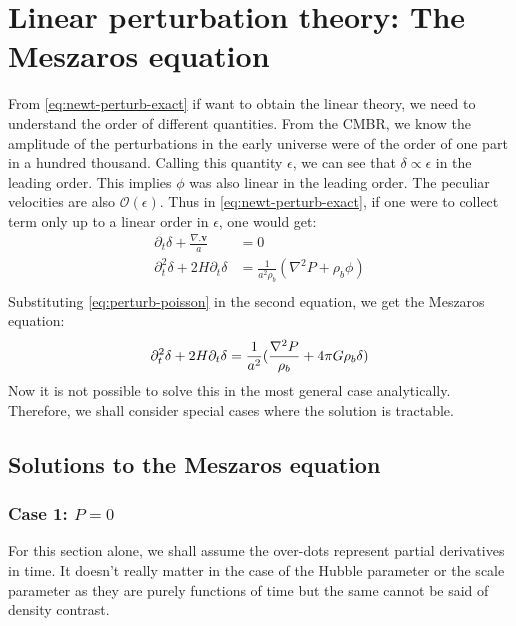 \documentclass[12pt,a4paper,oneside]{book}
\def\pa{{\partial}}
\begin{document}
	\section{Linear perturbation theory: The Meszaros equation}
		From \ref{eq:newt-perturb-exact} if want to obtain the linear theory, we need to understand the order of different quantities. From the CMBR, we know the amplitude of the perturbations in the early universe were of the order of one part in a hundred thousand. Calling this quantity $\epsilon$, we can see that $\delta\propto\epsilon$ in the leading order. This implies $\phi$ was also linear in the leading order. The peculiar velocities are also $\mathcal{O}(\epsilon)$. Thus in \ref{eq:newt-perturb-exact}, if one were to collect term only up to a linear order in $\epsilon$, one would get:
		$$
		\begin{aligned}
			\partial_t\delta+\frac{\nabla.\mathbf{v}}{a}&=0\\
			\pa_t^2\delta+2H\pa_t\delta&=\frac{1}{a^2\rho_b}(\nabla^2P+\rho_b\phi)\\
		\end{aligned}
		$$
		Substituting \ref{eq:perturb-poisson} in the second equation, we get the Meszaros equation:
		\begin{equation}
			\pa_t^2\delta+2H\pa_t\delta=\frac{1}{a^2}(\frac{\nabla^2P}{\rho_b}+4\pi G\rho_b\delta)\\
			\label{eq:meszaros}
		\end{equation}
		Now it is not possible to solve this in the most general case analytically. Therefore, we shall consider special cases where the solution is tractable.
		\subsection{Solutions to the Meszaros equation}
			\subsubsection{Case 1: $P=0$}
				For this section alone, we shall assume the over-dots represent partial derivatives in time. It doesn't really matter in the case of the Hubble parameter or the scale parameter as they are purely functions of time but the same cannot be said of density contrast. 
				
\end{document}
